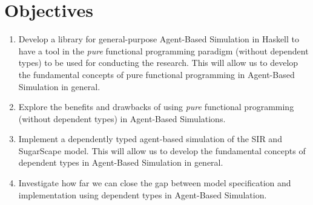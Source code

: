 \section{Objectives}
\begin{enumerate}
	\item Develop a library for general-purpose Agent-Based Simulation in Haskell to have a tool in the \textit{pure} functional programming paradigm (without dependent types) to be used for conducting the research. This will allow us to develop the fundamental concepts of pure functional programming in Agent-Based Simulation in general.

	\item Explore the benefits and drawbacks of using \textit{pure} functional programming (without dependent types) in Agent-Based Simulations.

	\item Implement a dependently typed agent-based simulation of the SIR and SugarScape model. This will allow us to develop the fundamental concepts of dependent types in Agent-Based Simulation in general.
	


	\item Investigate how far we can close the gap between model specification and implementation using dependent types in Agent-Based Simulation. %
\end{enumerate}